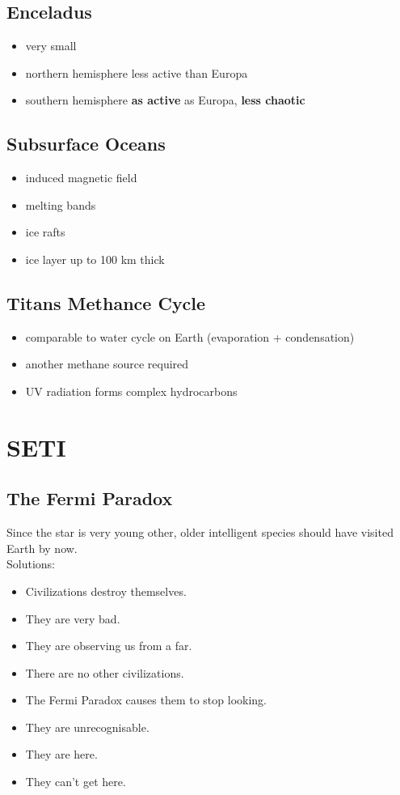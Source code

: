\documentclass{article}
\theoremstyle{sltheorem}
\begin{document}
\subsection{Enceladus}
\begin{itemize}
	\item very small
	\item northern hemisphere less active than Europa
	\item southern hemisphere \textbf{as active} as Europa, \textbf{less chaotic}
\end{itemize}
\subsection{Subsurface Oceans}
\begin{itemize}
	\item induced magnetic field
	\item melting bands
	\item ice rafts
	\item ice layer up to 100 km thick
\end{itemize}
\subsection{Titans Methance Cycle}
\begin{itemize}
	\item comparable to water cycle on Earth (evaporation + condensation)
	\item another methane source required
	\item UV radiation forms complex hydrocarbons
\end{itemize}
\section{SETI}
\subsection{The Fermi Paradox}
Since the star is very young other, older intelligent species should have visited Earth by now.\\
Solutions:
\begin{itemize}
	\item Civilizations destroy themselves.
	\item They are very bad.
	\item They are observing us from a far.
	\item There are no other civilizations.
	\item The Fermi Paradox causes them to stop looking.
	\item They are unrecognisable.
	\item They are here.
	\item They can't get here.
\end{itemize}
\end{document}
